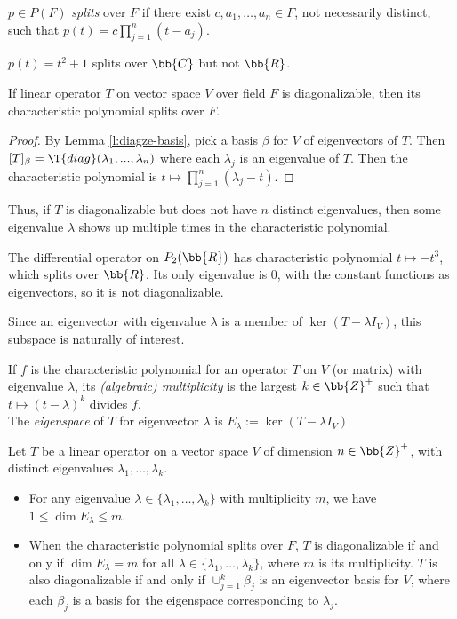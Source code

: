 \begin{defn}
$p \in P(F)$ \emph{splits} over $F$ if there exist $c,a_1, \ldots,a_n \in F$, not necessarily distinct, such that $p(t)=c \prod_{j=1}^n(t-a_j)$.
\end{defn}
$p(t)=t^2+1$ splits over $\bb{C}$ but not $\bb{R}$.
\begin{lem}
If linear operator $T$ on vector space $V$ over field $F$ is diagonalizable, then its characteristic polynomial splits over $F$.
\end{lem}
\begin{proof}%
By Lemma \ref{l:diagze-basis}, pick a basis $\beta$ for $V$ of eigenvectors of $T$. Then $[T]_\beta = \T{diag}( \lambda_1,..., \lambda_n)$ where each $\lambda_j$ is an eigenvalue of $T$.
Then the characteristic polynomial is $t \mapsto \prod_{j=1}^n( \lambda_j-t)$.
\end{proof}
Thus, if $T$ is diagonalizable but does not have $n$ distinct eigenvalues, then some eigenvalue $\lambda$ shows up multiple times in the characteristic polynomial.
\begin{example}\label{e:splits-not-diagle}
The differential operator on $P_2( \bb{R})$ has characteristic polynomial $t \mapsto -t^3$, which splits over $\bb{R}$. Its only eigenvalue is 0, with the constant functions as eigenvectors, so it is not diagonalizable.
\end{example}
Since an eigenvector with eigenvalue $\lambda$ is a member of $\ker (T- \lambda I_V)$, this subspace is naturally of interest.
\begin{defn}
If $f$ is the characteristic polynomial for an operator $T$ on $V$ (or matrix) with eigenvalue $\lambda$, its \emph{(algebraic) multiplicity} is the largest $k \in \bb{Z}^+$ such that $t \mapsto (t- \lambda)^k$ divides $f$.\\
The \emph{eigenspace} of $T$ for eigenvector $\lambda$ is $E_\lambda := \ker (T- \lambda I_V)$
\end{defn}
\begin{prop}\label{p:diagze-mult}
Let $T$ be a linear operator on a vector space $V$ of dimension $n \in \bb{Z}^+$, with distinct eigenvalues $\lambda_1, \ldots, \lambda_k$.
\begin{itemize}
\item For any eigenvalue $\lambda \in \{ \lambda_1, \ldots, \lambda_k \}$ with multiplicity $m$, we have $1 \leq \dim E_\lambda \leq m$.
\item When the characteristic polynomial splits over $F$, $T$ is diagonalizable if and only if $\dim E_\lambda =m$ for all $\lambda \in \{ \lambda_1, \ldots, \lambda_k \}$, where $m$ is its multiplicity.
$T$ is also diagonalizable if and only if $\cup_{j=1}^k \beta_j$ is an eigenvector basis for $V$, where each $\beta_j$ is a basis for the eigenspace corresponding to $\lambda_j$.
\end{itemize}
\end{prop}

